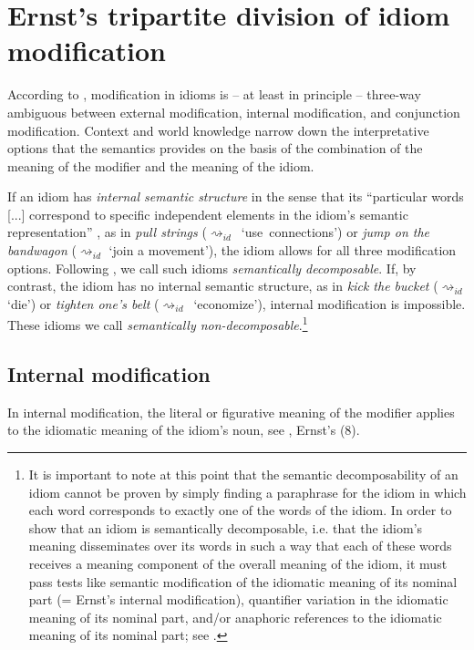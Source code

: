 \documentclass[output=paper]{langsci/langscibook}
\begin{document}
\section{Ernst's tripartite division of idiom modification} \label{Ernst 81}

According to \citet{ernst81}, modification in idioms is -- at least in principle -- three-way ambiguous between external modification, internal modification, and conjunction modification. Context and world knowledge narrow down the interpretative options that the semantics provides on the basis of the combination of the meaning of the modifier and the meaning of the idiom. 
 
If an idiom has \textit{internal semantic structure} in the sense that its ``particular words [...] correspond to specific independent elements in the idiom's semantic representation'' \citep[67]{ernst81}, as in \textit{pull strings} \mbox{($\rightsquigarrow_{id}$ `use connections')} or \textit{jump on the bandwagon} ($\rightsquigarrow_{id}$ `join a movement'), the idiom allows for all three modification options. Following \citet{Nunberg:al:94}, we call such idioms \textit{semantically decomposable}. If, by contrast, the idiom has no internal semantic structure, as in \textit{kick the bucket} ($\rightsquigarrow_{id}$ `die') or \textit{tighten one's belt} \mbox{($\rightsquigarrow_{id}$ `economize')}, internal modification is impossible. These idioms we call \textit{semantically non-decomposable}.\footnote{It is important to note at this point that the semantic decomposability of an idiom cannot be proven by simply finding a paraphrase for the idiom in which each word corresponds to exactly one of the words of the idiom. In order to show that an idiom is semantically decomposable, i.e. that the idiom's meaning disseminates over its words in such a way that each of these words receives a meaning component of the overall meaning of the idiom, it must pass tests like semantic modification of the idiomatic meaning of its nominal part (= Ernst's internal modification), quantifier variation in the idiomatic meaning of its nominal part, and/or anaphoric references to the idiomatic meaning of its nominal part; see \citet{Nunberg:al:94}.}



\subsection{Internal modification} \label{IntMod}

In internal modification, the literal or figurative meaning of the modifier applies to the idiomatic meaning of the idiom's noun, see , Ernst's (8).
\end{document}
